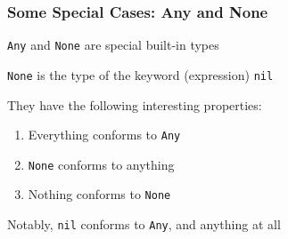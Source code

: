 \begin{frame}

\frametitle{Some Special Cases: Any and None}

\begin{center}

\lstinline{Any} and \lstinline{None} are special built-in types

\lstinline{None} is the type of the keyword (expression) \lstinline{nil}

\end{center}

\vspace{\fill}

They have the following interesting properties:

\begin{enumerate}

\item Everything conforms to \lstinline{Any}

\item \lstinline{None} conforms to anything

\item Nothing conforms to \lstinline{None}

\end{enumerate}

Notably, \lstinline{nil} conforms to \lstinline{Any}, and anything at all

\end{frame}


